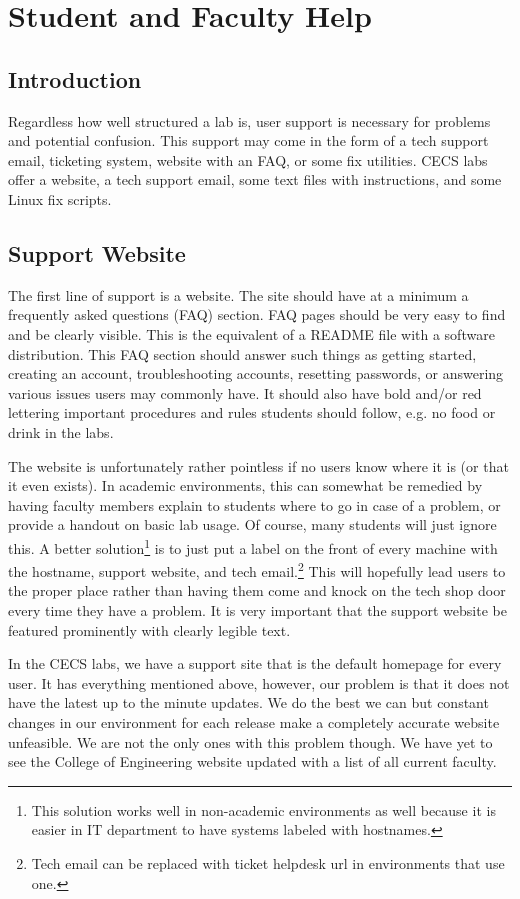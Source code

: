 \section{Student and Faculty Help}\label{sec:student_faculty_help}
\subsection{Introduction}
Regardless how well structured a lab is, user support is necessary for problems and potential confusion.  This support may come in the form of a tech support email, ticketing system, website with an FAQ, or some fix utilities.  CECS labs offer a website, a tech support email, some text files with instructions, and some Linux fix scripts.
\subsection{Support Website}
The first line of support is a website.  The site should have at a minimum a frequently asked questions (FAQ) section.  FAQ pages should be very easy to find and be clearly visible.  This is the equivalent of a README file with a software distribution.  This FAQ section should answer such things as getting started, creating an account, troubleshooting accounts, resetting passwords, or answering various issues users may commonly have.  It should also have bold and/or red lettering important procedures and rules students should follow, e.g. no food or drink in the labs. 

The website is unfortunately rather pointless if no users know where it is (or that it even exists).  In academic environments, this can somewhat be remedied by having faculty members explain to students where to go in case of a problem, or provide a handout on basic lab usage.  Of course, many students will just ignore this.  A better solution\footnote{This solution works well in non-academic environments as well because it is easier in IT department to have systems labeled with hostnames.} is to just put a label on the front of every machine with the hostname, support website, and tech email.\footnote{Tech email can be replaced with ticket helpdesk url in environments that use one.}  This will hopefully lead users to the proper place rather than having them come and knock on the tech shop door every time they have a problem.  It is very important that the support website be featured prominently with clearly legible text. 

In the CECS labs, we have a support site that is the default homepage for every user.  It has everything mentioned above, however, our problem is that it does not have the latest up to the minute updates.  We do the best we can but constant changes in our environment for each release make a completely accurate website unfeasible.  We are not the only ones with this problem though.  We have yet to see the College of Engineering website updated with a list of all current faculty.  

